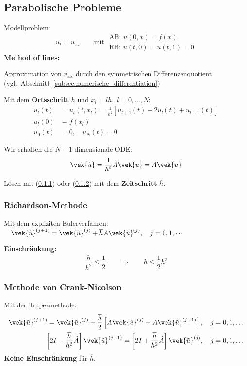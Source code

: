 	\subsection{Parabolische Probleme}
		Modellproblem:
		\[
			u_t = u_{xx} \qquad \text{mit } \begin{array}{l}
				\text{AB: } u(0,x)=f(x) \\
				\text{RB: } u(t,0) = u(t,1)=0
			\end{array}
		\]
		\textbf{Method of lines:}
		\begin{tightenumerate}
			\item Approximation von $u_{xx}$ durch den symmetrischen Differenzenquotient (vgl.~Abschnitt~\ref{subsec:numerische_differentiation})
			\item Mit dem \textbf{Ortsschritt} $h$ und $x_l = lh,$ $l=0,\dots, N$:
				\begin{align*}
					\dot u_l(t) &= u_t(t,x_l) = \frac{1}{h^2}\left[ u_{l+1}(t) - 2u_l(t) + u_{l-1}(t)\right] \\
					u_l(0) &= f(x_l) \\
					u_0(t) &= 0,\quad u_N(t) = 0
				\end{align*}
			\item Wir erhalten die $N-1$-dimensionale ODE:
				\[
					\vek{\dot u} = \frac{1}{h^2} \hat A \vek{u} = A \vek{u}
				\]
			\item Lösen mit (\ref{richardson}) oder (\ref{crank}) mit dem \textbf{Zeitschritt} $\overline{h}$.
		\end{tightenumerate}

		\subsubsection{Richardson-Methode}
			\label{richardson}
			Mit dem expliziten Eulerverfahren: $\quad \vek{\tilde u}^{(j+1)}= \vek{\tilde u}^{(j)} + \overline{h}A\vek{\tilde u}^{(j)}, \quad j=0,1,\cdots$

			\textbf{Einschränkung:}
			\[
				\frac{\overline{h}}{h^2} \leq \frac{1}{2} \qquad \Rightarrow\qquad \overline{h}\leq \frac{1}{2} h^2
			\]

		\subsubsection{Methode von Crank-Nicolson}
			\label{crank}
			Mit der Trapezmethode:
			\begin{align*}
				\vek{\tilde u}^{(j+1)} = \vek{\tilde u}^{(j)} + \frac{\overline{h}}{2}\left[A\vek{\tilde u}^{(j)} + A\vek{\tilde u}^{(j+1)}\right], \quad j=0,1,\dots \\
				\left[ 2I - \frac{\overline{h}}{h^2}\hat A\right]\vek{\tilde u}^{(j+1)} = \left[ 2I + \frac{\overline{h}}{h^2}\hat A\right]\vek{\tilde u}^{(j)}, \quad j=0,1,\dots
			\end{align*}
			\textbf{Keine Einschränkung} für $\overline{h}$.

